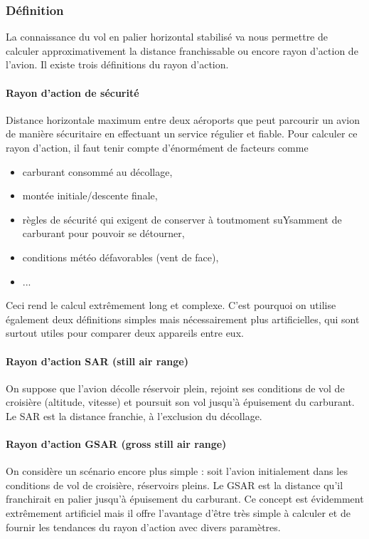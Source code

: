 \documentclass{report}
\begin{document}
\subsubsection{Définition} La connaissance du vol en palier horizontal stabilisé va nous permettre de calculer approximativement la distance franchissable ou encore rayon d’action de l’avion. Il existe trois définitions du rayon d’action.

\paragraph{Rayon d’action de sécurité} Distance horizontale maximum entre deux aéroports
que peut parcourir un avion de manière sécuritaire en effectuant un service
régulier et fiable. Pour calculer ce rayon d’action, il faut tenir compte d'énormément de facteurs comme 
\begin{itemize}
    \item carburant consommé au décollage,
    \item montée initiale/descente finale,
    \item règles de sécurité qui exigent de conserver à toutmoment suYsamment
de carburant pour pouvoir se détourner,
\item conditions météo défavorables (vent de face),
\item ...
\end{itemize}
Ceci rend le calcul extrêmement long et complexe. C’est pourquoi on utilise
également deux définitions simples mais nécessairement plus artificielles,
qui sont surtout utiles pour comparer deux appareils entre eux.

\paragraph{Rayon d’action SAR (still air range)} On suppose que l’avion décolle réservoir
plein, rejoint ses conditions de vol de croisière (altitude, vitesse) et poursuit
son vol jusqu’à épuisement du carburant. Le SAR est la distance franchie,
à l’exclusion du décollage.

\paragraph{Rayon d’action GSAR (gross still air range)} On considère un scénario encore plus
simple : soit l’avion initialement dans les conditions de vol de croisière, réservoirs
pleins. Le GSAR est la distance qu’il franchirait en palier jusqu’à
épuisement du carburant. Ce concept est évidemment extrêmement artificiel
mais il offre l’avantage d’être très simple à calculer et de fournir les
tendances du rayon d’action avec divers paramètres.
\end{document}
